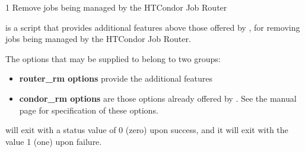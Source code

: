 \begin{ManPage}{\label{man-condor-router-rm}}{1}
{Remove jobs being managed by the HTCondor Job Router}
\Synopsis {}


\Description
{} is a script that provides additional features
above those offered by , 
for removing jobs being managed by the HTCondor Job Router. 

The options that may be supplied to  belong to two groups:
\begin{itemize}
	\item \textbf{router\_rm options} provide the additional features
	\item \textbf{condor\_rm options} are those options already offered
by .  See 
the  manual page for specification of these options. 
\end{itemize}

\begin{Options}
\end{Options}

\ExitStatus

 will exit with a status value of 0 (zero) upon success,
and it will exit with the value 1 (one) upon failure.

\end{ManPage}

